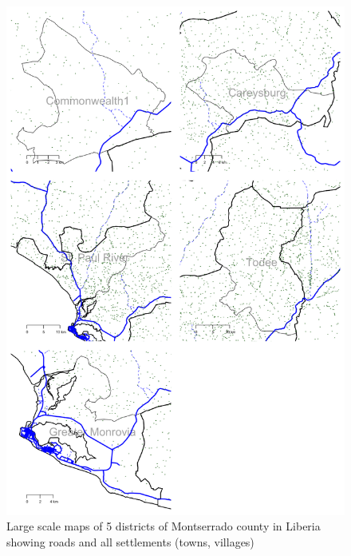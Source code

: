 \documentclass[12pt,a4paper]{book}
\theoremstyle{definition}
\theoremstyle{definition}
\theoremstyle{definition}
\theoremstyle{remark}
\begin{document}
\begin{figure}[H]

{\centering \includegraphics{figures/largeScaleMapDistricts1-1} 

}

\caption{Large scale maps of 5 districts of Montserrado county in Liberia showing roads and all settlements (towns, villages)}\label{fig:largeScaleMapDistricts1}
\end{figure}

\newpage
\end{document}
